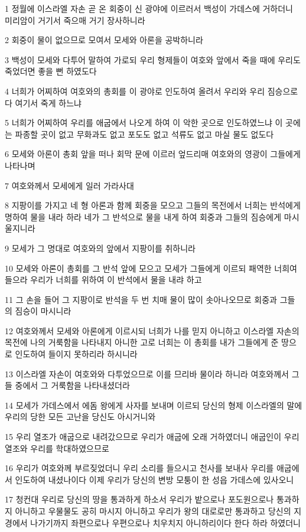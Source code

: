 \par 1 정월에 이스라엘 자손 곧 온 회중이 신 광야에 이르러서 백성이 가데스에 거하더니 미리암이 거기서 죽으매 거기 장사하니라
\par 2 회중이 물이 없으므로 모여서 모세와 아론을 공박하니라
\par 3 백성이 모세와 다투어 말하여 가로되 우리 형제들이 여호와 앞에서 죽을 때에 우리도 죽었더면 좋을 뻔 하였도다
\par 4 너희가 어찌하여 여호와의 총회를 이 광야로 인도하여 올려서 우리와 우리 짐승으로 다 여기서 죽게 하느냐
\par 5 너희가 어찌하여 우리를 애굽에서 나오게 하여 이 악한 곳으로 인도하였느냐 이 곳에는 파종할 곳이 없고 무화과도 없고 포도도 없고 석류도 없고 마실 물도 없도다
\par 6 모세와 아론이 총회 앞을 떠나 회막 문에 이르러 엎드리매 여호와의 영광이 그들에게 나타나며
\par 7 여호와께서 모세에게 일러 가라사대
\par 8 지팡이를 가지고 네 형 아론과 함께 회중을 모으고 그들의 목전에서 너희는 반석에게 명하여 물을 내라 하라 네가 그 반석으로 물을 내게 하여 회중과 그들의 짐승에게 마시울지니라
\par 9 모세가 그 명대로 여호와의 앞에서 지팡이를 취하니라
\par 10 모세와 아론이 총회를 그 반석 앞에 모으고 모세가 그들에게 이르되 패역한 너희여 들으라 우리가 너희를 위하여 이 반석에서 물을 내랴 하고
\par 11 그 손을 들어 그 지팡이로 반석을 두 번 치매 물이 많이 솟아나오므로 회중과 그들의 짐승이 마시니라
\par 12 여호와께서 모세와 아론에게 이르시되 너희가 나를 믿지 아니하고 이스라엘 자손의 목전에 나의 거룩함을 나타내지 아니한 고로 너희는 이 총회를 내가 그들에게 준 땅으로 인도하여 들이지 못하리라 하시니라
\par 13 이스라엘 자손이 여호와와 다투었으므로 이를 므리바 물이라 하니라 여호와께서 그들 중에서 그 거룩함을 나타내셨더라
\par 14 모세가 가데스에서 에돔 왕에게 사자를 보내며 이르되 당신의 형제 이스라엘의 말에 우리의 당한 모든 고난을 당신도 아시거니와
\par 15 우리 열조가 애굽으로 내려갔으므로 우리가 애굽에 오래 거하였더니 애굽인이 우리 열조와 우리를 학대하였으므로
\par 16 우리가 여호와께 부르짖었더니 우리 소리를 들으시고 천사를 보내사 우리를 애굽에서 인도하여 내셨나이다 이제 우리가 당신의 변방 모퉁이 한 성읍 가데스에 있사오니
\par 17 청컨대 우리로 당신의 땅을 통과하게 하소서 우리가 밭으로나 포도원으로나 통과하지 아니하고 우물물도 공히 마시지 아니하고 우리가 왕의 대로로만 통과하고 당신의 지경에서 나가기까지 좌편으로나 우편으로나 치우치지 아니하리이다 한다 하라 하였더니
